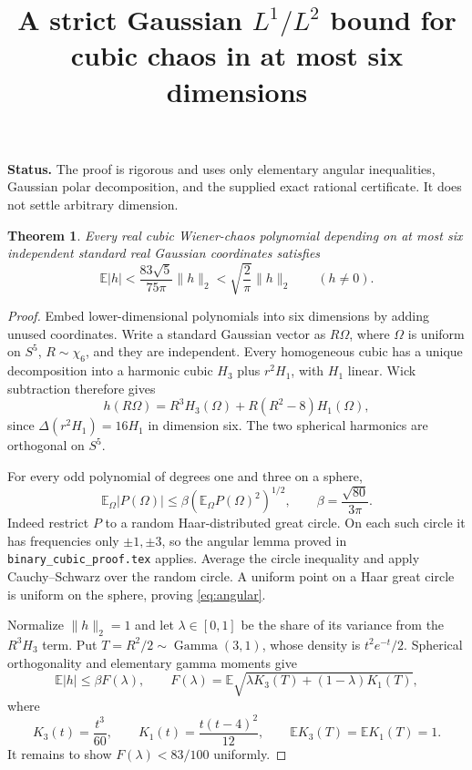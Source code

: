 \documentclass[11pt]{article}
\title{A strict Gaussian $L^1/L^2$ bound for cubic chaos in at most six dimensions}
\author{}
\date{}
\newtheorem{theorem}{Theorem}
\newcommand{\E}{\mathbb E}
\begin{document}
\maketitle
\noindent\textbf{Status.} The proof is rigorous and uses only elementary
angular inequalities, Gaussian polar decomposition, and the supplied exact
rational certificate. It does not settle arbitrary dimension.

\begin{theorem}
Every real cubic Wiener-chaos polynomial depending on at most six independent
standard real Gaussian coordinates satisfies
\[
 \boxed{\E|h|<\frac{83\sqrt5}{75\pi}\|h\|_2
       <\sqrt{\frac2\pi}\|h\|_2\qquad(h\ne0).}
\]
\end{theorem}

\begin{proof}
Embed lower-dimensional polynomials into six dimensions by adding unused
coordinates. Write a standard Gaussian vector as $R\Omega$, where
$\Omega$ is uniform on $S^5$, $R\sim\chi_6$, and they are independent.
Every homogeneous cubic has a unique decomposition into a harmonic cubic
$H_3$ plus $r^2 H_1$, with $H_1$ linear. Wick subtraction therefore gives
\[
 h(R\Omega)=R^3H_3(\Omega)+R(R^2-8)H_1(\Omega),
\]
since $\Delta(r^2H_1)=16H_1$ in dimension six. The two spherical harmonics
are orthogonal on $S^5$.

For every odd polynomial of degrees one and three on a sphere,
\begin{equation}\label{eq:angular}
 \E_\Omega|P(\Omega)|\leq\beta(\E_\Omega P(\Omega)^2)^{1/2},
 \qquad \beta=\frac{\sqrt{80}}{3\pi}.
\end{equation}
Indeed restrict $P$ to a random Haar-distributed great circle. On each such
circle it has frequencies only $\pm1,\pm3$, so the angular lemma proved in
\texttt{binary\_cubic\_proof.tex} applies. Average the circle inequality and
apply Cauchy--Schwarz over the random circle. A uniform point on a Haar
great circle is uniform on the sphere, proving \eqref{eq:angular}.

Normalize $\|h\|_2=1$ and let $\lambda\in[0,1]$ be the share of its variance
from the $R^3H_3$ term. Put $T=R^2/2\sim\operatorname{Gamma}(3,1)$, whose
density is $t^2e^{-t}/2$. Spherical orthogonality and elementary gamma moments
give
\[
 \E|h|\leq\beta F(\lambda),\qquad
 F(\lambda)=\E\sqrt{\lambda K_3(T)+(1-\lambda)K_1(T)},
\]
where
\[
 K_3(t)=\frac{t^3}{60},\qquad
 K_1(t)=\frac{t(t-4)^2}{12},\qquad
 \E K_3(T)=\E K_1(T)=1.
\]
It remains to show $F(\lambda)<83/100$ uniformly.


\end{proof}
\end{document}
